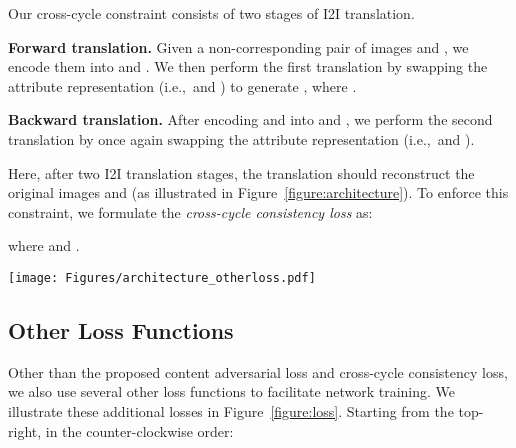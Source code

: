 \documentclass[runningheads]{llncs}
\newlength\figmargin
\newlength\secmargin
\newlength\subsecmargin
\newlength\eqmargin
\def\ie{i.e.,~}
\newcommand{\figref}[1]{Figure~\ref{figure:#1}}
\begin{document}
Our cross-cycle constraint consists of two stages of I2I translation.

\noindent \textbf{Forward translation.} Given a non-corresponding pair of images  and ,  we encode them into  and .
We then perform the first translation by swapping the attribute representation (\ie  and ) to generate , where .
\vspace{\eqmargin}

\vspace{\eqmargin}

\noindent \textbf{Backward translation.} After encoding  and  into  and , we perform the second translation by once again swapping the attribute representation (\ie  and ).
\vspace{\eqmargin}

\vspace{\eqmargin}

Here, after two I2I translation stages, the translation should reconstruct the original images  and  (as illustrated in \figref{architecture}).
To enforce this constraint, we formulate the \textit{cross-cycle consistency loss} as:

\vspace{\eqmargin}

\vspace{\eqmargin}
where  and .

\begin{figure*}[t]
	\centering
		\texttt{[image: Figures/architecture\_otherloss.pdf]}\caption{\textbf{Loss functions.} 
    In addition to the cross-cycle reconstruction loss  and the content adversarial loss  described in Figure~\ref{figure:architecture}, we apply several additional loss functions in our training process. 
The self-reconstruction loss  facilitates training with self-reconstruction;
    the KL loss  aims to align the attribute representation with a prior Gaussian distribution;
    the adversarial loss  encourages  to generate realistic images in each domain; 
    and the latent regression loss  enforces the reconstruction on the latent attribute vector.
    More details can be found in Section~\ref{subsec:learn}.}
	\label{figure:loss}
    \vspace{\figmargin}
\end{figure*}


\subsection{Other Loss Functions}
\label{subsec:learn}
\vspace{\subsecmargin}
Other than the proposed content adversarial loss and cross-cycle consistency loss, we also use several other loss functions to facilitate network training.
We illustrate these additional losses in \figref{loss}. 
Starting from the top-right, in the counter-clockwise order:
\end{document}
